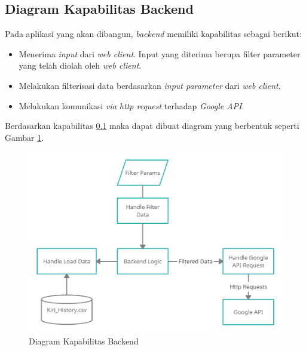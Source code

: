 \subsection{Diagram Kapabilitas Backend}
\label{sec:backendCapabilityDiagram}
Pada aplikasi yang akan dibangun, \textit{backend} memiliki kapabilitas sebagai berikut:
\begin{itemize}
    \item Menerima \textit{input} dari \textit{web client}. Input yang diterima berupa filter parameter yang telah diolah oleh \textit{web client}.
    \item Melakukan filterisasi data berdasarkan \textit{input parameter} dari \textit{web client}.
    \item Melakukan komunikasi \textit{via http request} terhadap \textit{Google API}.
\end{itemize}

Berdasarkan kapabilitas \ref{sec:backendCapabilityDiagram} maka dapat dibuat diagram yang berbentuk seperti Gambar \ref{fig:backendCapabilityDiagram}.

\begin{figure}[H]
	\centering  
	\includegraphics[scale=0.25]{Gambar/Kiri_Backend_Capabilty.png}  
	\caption[Rancangan Diagram Kapabilitas]{Diagram Kapabilitas Backend} 
	\label{fig:backendCapabilityDiagram} 
\end{figure}

